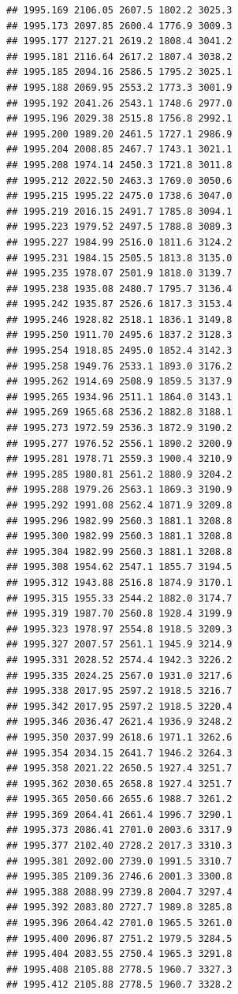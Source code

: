 \documentclass[
]{book}
\begin{document}
\begin{verbatim}
## 1995.169 2106.05 2607.5 1802.2 3025.3
## 1995.173 2097.85 2600.4 1776.9 3009.3
## 1995.177 2127.21 2619.2 1808.4 3041.2
## 1995.181 2116.64 2617.2 1807.4 3038.2
## 1995.185 2094.16 2586.5 1795.2 3025.1
## 1995.188 2069.95 2553.2 1773.3 3001.9
## 1995.192 2041.26 2543.1 1748.6 2977.0
## 1995.196 2029.38 2515.8 1756.8 2992.1
## 1995.200 1989.20 2461.5 1727.1 2986.9
## 1995.204 2008.85 2467.7 1743.1 3021.1
## 1995.208 1974.14 2450.3 1721.8 3011.8
## 1995.212 2022.50 2463.3 1769.0 3050.6
## 1995.215 1995.22 2475.0 1738.6 3047.0
## 1995.219 2016.15 2491.7 1785.8 3094.1
## 1995.223 1979.52 2497.5 1788.8 3089.3
## 1995.227 1984.99 2516.0 1811.6 3124.2
## 1995.231 1984.15 2505.5 1813.8 3135.0
## 1995.235 1978.07 2501.9 1818.0 3139.7
## 1995.238 1935.08 2480.7 1795.7 3136.4
## 1995.242 1935.87 2526.6 1817.3 3153.4
## 1995.246 1928.82 2518.1 1836.1 3149.8
## 1995.250 1911.70 2495.6 1837.2 3128.3
## 1995.254 1918.85 2495.0 1852.4 3142.3
## 1995.258 1949.76 2533.1 1893.0 3176.2
## 1995.262 1914.69 2508.9 1859.5 3137.9
## 1995.265 1934.96 2511.1 1864.0 3143.1
## 1995.269 1965.68 2536.2 1882.8 3188.1
## 1995.273 1972.59 2536.3 1872.9 3190.2
## 1995.277 1976.52 2556.1 1890.2 3200.9
## 1995.281 1978.71 2559.3 1900.4 3210.9
## 1995.285 1980.81 2561.2 1880.9 3204.2
## 1995.288 1979.26 2563.1 1869.3 3190.9
## 1995.292 1991.08 2562.4 1871.9 3209.8
## 1995.296 1982.99 2560.3 1881.1 3208.8
## 1995.300 1982.99 2560.3 1881.1 3208.8
## 1995.304 1982.99 2560.3 1881.1 3208.8
## 1995.308 1954.62 2547.1 1855.7 3194.5
## 1995.312 1943.88 2516.8 1874.9 3170.1
## 1995.315 1955.33 2544.2 1882.0 3174.7
## 1995.319 1987.70 2560.8 1928.4 3199.9
## 1995.323 1978.97 2554.8 1918.5 3209.3
## 1995.327 2007.57 2561.1 1945.9 3214.9
## 1995.331 2028.52 2574.4 1942.3 3226.2
## 1995.335 2024.25 2567.0 1931.0 3217.6
## 1995.338 2017.95 2597.2 1918.5 3216.7
## 1995.342 2017.95 2597.2 1918.5 3220.4
## 1995.346 2036.47 2621.4 1936.9 3248.2
## 1995.350 2037.99 2618.6 1971.1 3262.6
## 1995.354 2034.15 2641.7 1946.2 3264.3
## 1995.358 2021.22 2650.5 1927.4 3251.7
## 1995.362 2030.65 2658.8 1927.4 3251.7
## 1995.365 2050.66 2655.6 1988.7 3261.2
## 1995.369 2064.41 2661.4 1996.7 3290.1
## 1995.373 2086.41 2701.0 2003.6 3317.9
## 1995.377 2102.40 2728.2 2017.3 3310.3
## 1995.381 2092.00 2739.0 1991.5 3310.7
## 1995.385 2109.36 2746.6 2001.3 3300.8
## 1995.388 2088.99 2739.8 2004.7 3297.4
## 1995.392 2083.80 2727.7 1989.8 3285.8
## 1995.396 2064.42 2701.0 1965.5 3261.0
## 1995.400 2096.87 2751.2 1979.5 3284.5
## 1995.404 2083.55 2750.4 1965.3 3291.8
## 1995.408 2105.88 2778.5 1960.7 3327.3
## 1995.412 2105.88 2778.5 1960.7 3328.2

\end{verbatim}
\end{document}
